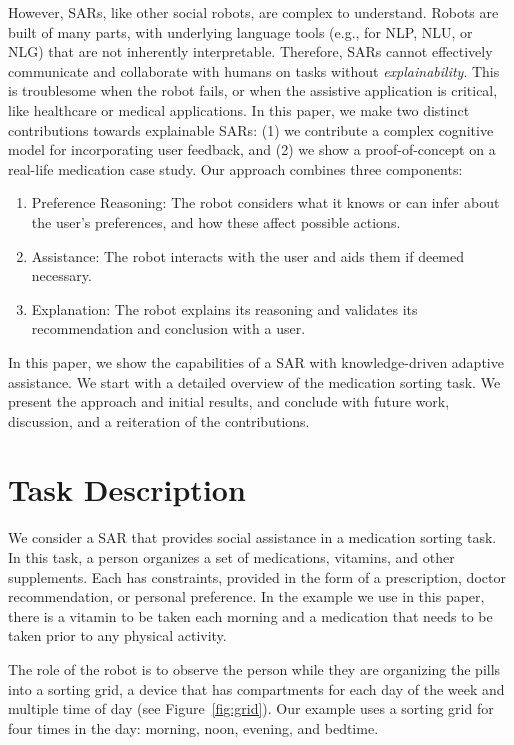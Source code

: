 \documentclass[letterpaper]{article} %
\begin{document}
However, SARs, like other social robots, are complex to understand.  Robots are built of many parts, with underlying language tools (e.g., for NLP, NLU, or NLG) that are  not inherently interpretable.  Therefore, SARs cannot
effectively communicate and collaborate with humans on tasks without \emph{explainability}.  This is
troublesome when the robot fails, or when the assistive application is
critical, like healthcare or medical applications.  In this paper, we
make two distinct contributions towards explainable SARs: (1) we
contribute a complex cognitive model for incorporating user feedback,
and (2) we show a proof-of-concept on a real-life medication case
study.  Our approach combines three components:
\begin{enumerate}
\item Preference Reasoning: The robot considers what it knows or can infer about the user's preferences, and how these affect possible actions.
\item Assistance: The robot interacts with the user and aids
them if deemed necessary.
\item Explanation: The robot explains its reasoning and validates its
recommendation and conclusion with a user.
\end{enumerate}
In this paper, we show the capabilities of a SAR with knowledge-driven
adaptive assistance.  We start with a detailed overview of the
medication sorting task.  We present the approach and initial results,
and conclude with future work, discussion, and a reiteration of the
contributions.

\section{Task Description}
\label{sec:task-description}
We consider a SAR that provides social assistance in a medication sorting task.  In this task, a person organizes a set of medications, vitamins, and other supplements.  Each has constraints, provided in the form of a prescription, doctor recommendation, or personal preference.  In the example we use in this paper, there is a vitamin to be taken each morning and a medication that needs to be taken prior to any physical activity.

The role of the robot is to observe the person while they are organizing the pills into a sorting grid, a device that has compartments for each day of the week and multiple time of day (see Figure~\ref{fig:grid}).  Our example uses a sorting grid for four times in the day: morning, noon, evening, and bedtime.
\end{document}
